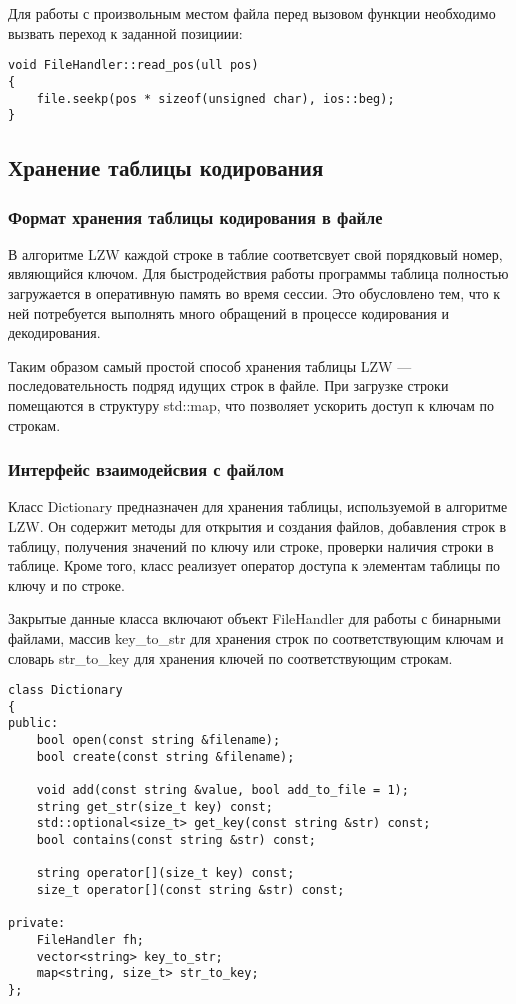 \documentclass[14pt, russian]{scrartcl}
\begin{document}
Для работы с произвольным местом файла перед вызовом функции необходимо вызвать переход к заданной позициии:
\begin{verbatim}
void FileHandler::read_pos(ull pos)
{
	file.seekp(pos * sizeof(unsigned char), ios::beg);
}
\end{verbatim}


\subsection{Хранение таблицы кодирования}
\subsubsection{Формат хранения таблицы кодирования в файле}
В алгоритме LZW каждой строке в таблие соответсвует свой порядковый номер, являющийся ключом. Для быстродействия работы программы таблица полностью загружается в оперативную память во время сессии. Это обусловлено тем, что к ней потребуется выполнять много обращений в процессе кодирования и декодирования. 

Таким образом самый простой способ хранения таблицы LZW --- последовательность подряд идущих строк в файле. При загрузке строки помещаются в структуру std::map, что позволяет ускорить доступ к ключам по строкам.

\subsubsection{Интерфейс взаимодейсвия с файлом}
Класс Dictionary предназначен для хранения таблицы, используемой в алгоритме LZW. Он содержит методы для открытия и создания файлов, добавления строк в таблицу, получения значений по ключу или строке, проверки наличия строки в таблице. Кроме того, класс реализует оператор доступа к элементам таблицы по ключу и по строке.

Закрытые данные класса включают объект FileHandler для работы с бинарными файлами, массив key\_to\_str для хранения строк по соответствующим ключам и словарь str\_to\_key для хранения ключей по соответствующим строкам.

\begin{verbatim}
class Dictionary
{
public:
	bool open(const string &filename);
	bool create(const string &filename);

	void add(const string &value, bool add_to_file = 1);
	string get_str(size_t key) const;
	std::optional<size_t> get_key(const string &str) const;
	bool contains(const string &str) const;

	string operator[](size_t key) const;
	size_t operator[](const string &str) const;

private:
	FileHandler fh;
	vector<string> key_to_str;
	map<string, size_t> str_to_key;
};
\end{verbatim}
\end{document}
